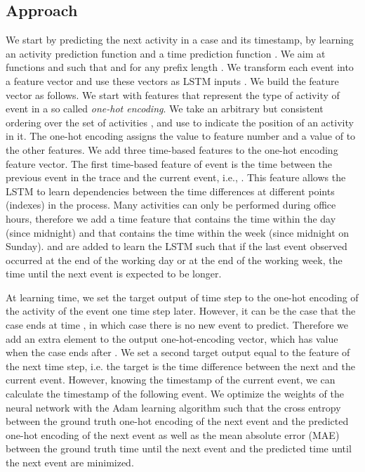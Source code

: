 \documentclass[runningheads,a4paper]{llncs}
\begin{document}
\subsection{Approach}
We start by predicting the next activity in a case and its timestamp, by learning an activity prediction function  and a time prediction function . We aim at functions  and  such that
 and  for any prefix length .
We transform each event  into a feature vector and use these vectors as LSTM inputs . We build the feature vector as follows. We start with  features that represent the type of activity of event  in a so called \emph{one-hot encoding}. We take an arbitrary but consistent ordering over the set of activities , and use  to indicate the position of an activity in it. The one-hot encoding assigns the value  to feature number  and a value of  to the other features. We add three time-based features to the one-hot encoding feature vector. The first time-based feature of event  is the time between the previous event in the trace and the current event, i.e., . This feature allows the LSTM to learn dependencies between the time differences at different points (indexes) in the process. Many activities can only be performed during office hours, therefore we add a time feature  that contains the time within the day (since midnight) and  that contains the time within the week (since midnight on Sunday).  and  are added to learn the LSTM such that if the last event observed occurred at the end of the working day or at the end of the working week, the time until the next event is expected to be longer.

At learning time, we set the target output  of time step  to the one-hot encoding of the activity of the event one time step later. However, it can be the case that the case ends at time , in which case there is no new event to predict. Therefore we add an extra element to the output one-hot-encoding vector, which has value  when the case ends after . We set a second target output  equal to the  feature of the next time step, i.e. the target is the time difference between the next and the current event. However, knowing the timestamp of the current event, we can calculate the timestamp of the following event. We optimize the weights of the neural network with the Adam learning algorithm \cite{Kingma2015} such that the cross entropy between the ground truth one-hot encoding of the next event and the predicted one-hot encoding of the next event as well as the mean absolute error (MAE) between the ground truth time until the next event and the predicted time until the next event are minimized. 
\end{document}
